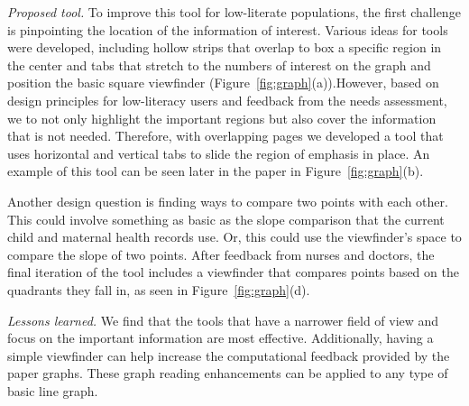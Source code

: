 \documentclass{sig-alternate}
\begin{document}
\emph{Proposed tool.}
To improve this tool for low-literate populations, the first challenge is pinpointing the location of the information of interest. Various ideas for tools were developed, including hollow strips that overlap to box a specific region in the center and tabs that stretch to the numbers of interest on the graph and position the basic square viewfinder (Figure~\ref{fig:graph}(a)).However, based on design principles for low-literacy users and feedback from the needs assessment, we to not only highlight the important regions but also cover the information that is not needed. Therefore, with overlapping pages we developed a tool that uses horizontal and vertical tabs to slide the region of emphasis in place. An example of this tool can be seen later in the paper in Figure~\ref{fig:graph}(b).

Another design question is finding ways to compare two points with each other. This could involve something as basic as the slope comparison that the current child and maternal health records use. Or, this could use the viewfinder's space to compare the slope of two points. After feedback from nurses and doctors, the final iteration of the tool includes a viewfinder that compares points based on the quadrants they fall in, as seen in Figure~\ref{fig:graph}(d).

\emph{Lessons learned.}
We find that the tools that have a narrower field of view and focus on the important information are most effective. Additionally, having a simple viewfinder can help increase the computational feedback provided by the paper graphs. 
These graph reading enhancements can be applied to any type of basic line graph. 
\end{document}

